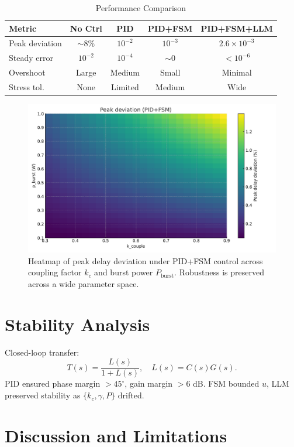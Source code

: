 \documentclass[conference]{IEEEtran}
\begin{document}
\begin{table}[h]
\renewcommand{\arraystretch}{1.1}
\caption{Performance Comparison}
\centering
\begin{tabular}{|l|c|c|c|c|}
\hline
Metric & No Ctrl & PID & PID+FSM & PID+FSM+LLM \\
\hline
Peak deviation & $\sim$8\% & $10^{-2}$ & $10^{-3}$ & $2.6\times 10^{-3}$ \\
Steady error   & $10^{-2}$ & $10^{-4}$ & $\sim$0 & $<10^{-6}$ \\
Overshoot      & Large     & Medium    & Small   & Minimal \\
Stress tol.    & None      & Limited   & Medium  & Wide \\
\hline
\end{tabular}
\end{table}

\begin{figure}[t]
    \centering
    \includegraphics[width=0.9\linewidth]{figs/heatmap.pdf}
    \caption{Heatmap of peak delay deviation under PID+FSM control across coupling factor $k_c$ and burst power $P_{\text{burst}}$. 
    Robustness is preserved across a wide parameter space.}
    \label{fig:heatmap}
\end{figure}

\section{Stability Analysis}
Closed-loop transfer:
\[
T(s) = \frac{L(s)}{1+L(s)}, \quad L(s)=C(s)G(s).
\]
PID ensured phase margin $>45^\circ$, gain margin $>6$ dB. FSM bounded $u$, LLM preserved stability as $\{k_c,\gamma,P\}$ drifted.

\section{Discussion and Limitations}
\end{document}
